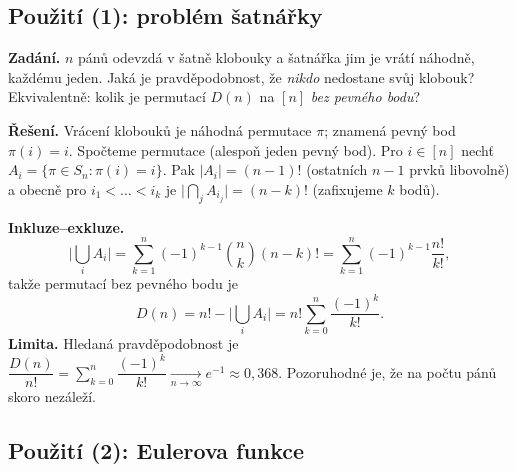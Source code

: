 \documentclass[11pt,a4paper]{article}
\begin{document}
\begin{center}
\end{center}

\subsection{Použití (1): problém šatnářky}

\begin{priklad}
\textbf{Zadání.} $n$ pánů odevzdá v šatně klobouky a šatnářka jim je vrátí náhodně, každému jeden. Jaká je pravděpodobnost, že \emph{nikdo} nedostane svůj klobouk? Ekvivalentně: kolik je permutací $D(n)$ na $[n]$ \emph{bez pevného bodu}?

\textbf{Řešení.}
Vrácení klobouků je náhodná permutace $\pi$;  znamená pevný bod $\pi(i)=i$. Spočteme  permutace (alespoň jeden pevný bod). Pro $i\in[n]$ nechť $A_i=\{\pi\in S_n:\pi(i)=i\}$. Pak $|A_i|=(n-1)!$ (ostatních $n-1$ prvků libovolně) a obecně pro $i_1<\dots<i_k$ je $\big|\bigcap_{j}A_{i_j}\big|=(n-k)!$ (zafixujeme $k$ bodů).\par
\textbf{Inkluze--exkluze.}
\[
\Big|\bigcup_{i}A_i\Big|=\sum_{k=1}^{n}(-1)^{k-1}\binom{n}{k}(n-k)!
=\sum_{k=1}^{n}(-1)^{k-1}\frac{n!}{k!},
\]
takže permutací bez pevného bodu je
\[
D(n)=n!-\Big|\bigcup_i A_i\Big|=n!\sum_{k=0}^{n}\frac{(-1)^k}{k!}.
\]
\textbf{Limita.} Hledaná pravděpodobnost je $\dfrac{D(n)}{n!}=\sum_{k=0}^{n}\dfrac{(-1)^k}{k!}\xrightarrow[n\to\infty]{}\boxed{e^{-1}\approx0{,}368}$. Pozoruhodné je, že na počtu pánů skoro nezáleží.
\end{priklad}

\subsection{Použití (2): Eulerova funkce}
\end{document}
